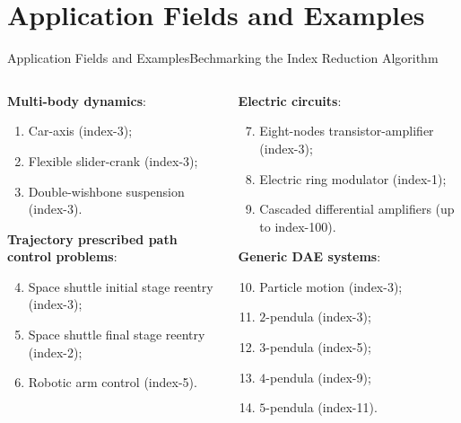 
\section{Application Fields and Examples}

\begin{frame}{Application Fields and Examples}{Bechmarking the Index Reduction Algorithm}
  \begin{columns}
    \hspace{0.035\textwidth}
    \begin{column}[t]{0.575\textwidth}
      \textbf{Multi-body dynamics}:
      \begin{enumerate}\small
        \item Car-axis (index-3);
        \item Flexible slider-crank (index-3);
        \item Double-wishbone suspension (index-3).
      \end{enumerate}
      \textbf{Trajectory prescribed path control problems}:
      \begin{enumerate}\setcounter{enumi}{3}\small
        \item Space shuttle initial stage reentry (index-3);
        \item Space shuttle final stage reentry (index-2);
        \item Robotic arm control  (index-5).
      \end{enumerate}
    \end{column}
    \hspace{-0.055\textwidth}
    \begin{column}[t]{0.55\textwidth}
      \textbf{Electric circuits}:
      \begin{enumerate}\setcounter{enumi}{6}\small
        \item Eight-nodes transistor-amplifier (index-3);
        \item Electric ring modulator (index-1);
        \item Cascaded differential amplifiers (up to index-100).
      \end{enumerate}
      \textbf{Generic \ac{DAE} systems}:
      \begin{enumerate}\setcounter{enumi}{9}\small
        \item Particle motion (index-3);
        \item $2$-pendula (index-3);
        \item $3$-pendula (index-5);
        \item $4$-pendula (index-9);
        \item $5$-pendula (index-11).
      \end{enumerate}
    \end{column}
  \end{columns}
\end{frame}

